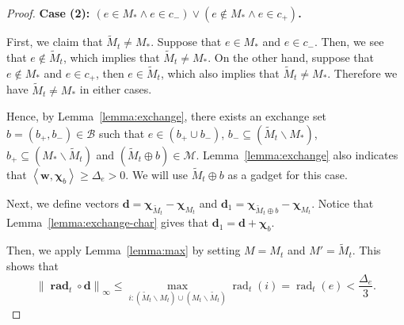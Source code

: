 \documentclass{article}
\newcommand{\M}{\mathcal M}
\newcommand{\B}{\mathcal B}
\newcommand{\del}{\backslash}
\DeclareMathOperator{\rad}{rad}
\newcommand{\inn}[1]{\left\langle #1 \right\rangle}
\newcommand{\nor}[1]{\left\|#1\right\|}
\renewcommand{\vec}[1]{\boldsymbol{#1}}
\renewcommand{\odot}{\circ}
\begin{document}
\begin{proof}
\textbf{Case (2): $(e \in M_* \wedge e\in c_-) \vee (e \not \in M_* \wedge e\in c_+)$.}

First, we claim that $\tilde M_t \not= M_*$.
Suppose that $e\in M_*$ and $e\in c_-$.
Then, we see that $e\not\in \tilde M_t$, which implies that $\tilde M_t\not=M_*$.
On the other hand, suppose that $e\not \in M_*$ and $e\in c_+$, then $e\in \tilde M_t$, which also implies that $\tilde M_t\not= M_*$.
Therefore we have $\tilde M_t\not=M_*$ in either cases.


Hence, by Lemma~\ref{lemma:exchange}, there exists an exchange set $b=(b_+,b_-)\in \B$ such that 
$e \in (b_+ \cup b_-)$, $b_-\subseteq  (\tilde M_t \del M_*)$, $b_+ \subseteq (M_* \del \tilde M_t)$ and
$(\tilde M_t \oplus b) \in \M$.
Lemma~\ref{lemma:exchange} also indicates that $\inn{\vec w, \vec \chi_b} \ge \Delta_e > 0$.
We will use $\tilde M_t \oplus b$ as a gadget for this case.


Next, we define vectors $\vec d = \vec \chi_{\tilde M_t} - \vec \chi_{M_t}$ and $\vec d_1 = \vec\chi_{\tilde M_t\oplus b}-\vec\chi_{M_t}$.
Notice that Lemma~\ref{lemma:exchange-char} gives that $\vec d_1= \vec d+\vec \chi_b$.

Then, we apply Lemma~\ref{lemma:max} by setting $M = M_t$ and $M' = \tilde M_t$. 
This shows that 
\begin{equation}
\nor{\vec \rad_t\odot \vec d}_\infty \le \max_{i: (\tilde M_t \del M_t)\cup (M_t\del \tilde M_t)} \rad_t(i) = \rad_t(e) < \frac{\Delta_e}{3}.
\label{eq:u-c-2-0}
\end{equation}


\end{proof}
\end{document}
